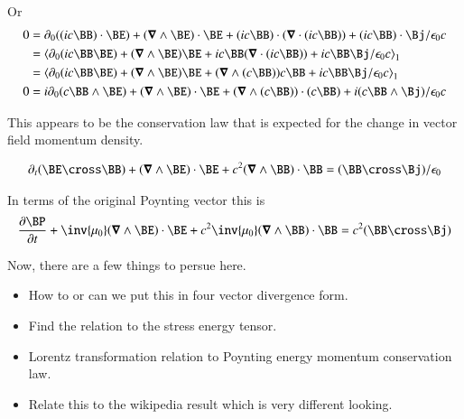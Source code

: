 \documentclass{article}
\begin{document}
Or
\begin{align*}
0 
&= \partial_0 {((ic \BB) \cdot \BE)} +(\spacegrad \wedge \BE) \cdot \BE + (i c\BB) \cdot (\spacegrad \cdot (ic \BB)) + (i c\BB) \cdot \Bj/\epsilon_0 c \\
&= \gpgradeone{ \partial_0 (ic \BB \BE) +(\spacegrad \wedge \BE) \BE + i c\BB (\spacegrad \cdot (ic \BB)) + i c\BB \Bj/\epsilon_0 c } \\
&= \gpgradeone{ \partial_0 (ic \BB \BE) +(\spacegrad \wedge \BE) \BE + (\spacegrad \wedge (c \BB)) c \BB + i c\BB \Bj/\epsilon_0 c } \\
0 &= i\partial_0 (c \BB \wedge \BE) + (\spacegrad \wedge \BE) \cdot \BE + (\spacegrad \wedge (c \BB)) \cdot (c \BB) + i( c\BB \wedge \Bj)/\epsilon_0 c
\end{align*}

This appears to be the conservation law that is expected for the change in vector field momentum density.

\begin{align}\label{eqn:momCons}
\partial_t (\BE \cross \BB) + (\spacegrad \wedge \BE) \cdot \BE + c^2 (\spacegrad \wedge \BB) \cdot \BB = (\BB \cross \Bj)/\epsilon_0
\end{align}

In terms of the original Poynting vector this is
\begin{align*}
\PD{t}{\BP} + \inv{\mu_0}(\spacegrad \wedge \BE) \cdot \BE + c^2 \inv{\mu_0}(\spacegrad \wedge \BB) \cdot \BB = c^2 (\BB \cross \Bj)
\end{align*}

%
%

Now, there are a few things to persue here.

\begin{itemize}
\item How to or can we put this in four vector divergence form.
\item Find the relation to the stress energy tensor.
\item Lorentz transformation relation to Poynting energy momentum conservation law.
\item Relate this to the wikipedia result which is very different looking.
\end{itemize}
\end{document}
